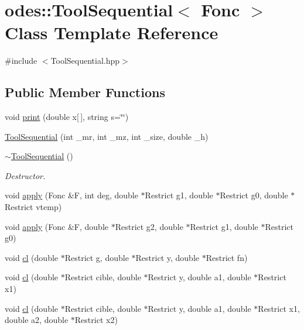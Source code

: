 \hypertarget{classodes_1_1ToolSequential}{\section{odes\-:\-:Tool\-Sequential$<$ Fonc $>$ Class Template Reference}
\label{classodes_1_1ToolSequential}
}


{\ttfamily \#include $<$Tool\-Sequential.\-hpp$>$}

\subsection*{Public Member Functions}
\begin{DoxyCompactItemize}
\item 
void \hyperlink{classodes_1_1ToolSequential_abacef9e3603066fcbf9516467493fd5d}{print} (double x\mbox{[}$\,$\mbox{]}, string s=\char`\"{}\char`\"{})
\item 
\hyperlink{classodes_1_1ToolSequential_ae681d13b161f735fedb5f340c042909b}{Tool\-Sequential} (int \-\_\-mr, int \-\_\-mz, int \-\_\-size, double \-\_\-h)
\item 
\hyperlink{classodes_1_1ToolSequential_a3f5b60f436f0d9c48a4614d09b926193}{$\sim$\-Tool\-Sequential} ()
\begin{DoxyCompactList}\small\item\em Destructor. \end{DoxyCompactList}\item 
void \hyperlink{classodes_1_1ToolSequential_a951ac437e954114f7c81edc801625b46}{apply} (Fonc \&F, int deg, double $\ast$Restrict g1, double $\ast$Restrict g0, double $\ast$Restrict vtemp)
\item 
void \hyperlink{classodes_1_1ToolSequential_a67f98bd54ea71a1118d685fce853f909}{apply} (Fonc \&F, double $\ast$Restrict g2, double $\ast$Restrict g1, double $\ast$Restrict g0)
\item 
void \hyperlink{classodes_1_1ToolSequential_accc88cc8648687b1bff7da26c5a7c007}{cl} (double $\ast$Restrict g, double $\ast$Restrict y, double $\ast$Restrict fn)
\item 
void \hyperlink{classodes_1_1ToolSequential_a5997929574f84f8e3d491ecedec4b556}{cl} (double $\ast$Restrict cible, double $\ast$Restrict y, double a1, double $\ast$Restrict x1)
\item 
void \hyperlink{classodes_1_1ToolSequential_adb424c1762d42185d527465264ae58c0}{cl} (double $\ast$Restrict cible, double $\ast$Restrict y, double a1, double $\ast$Restrict x1, double a2, double $\ast$Restrict x2)

\end{DoxyCompactItemize}
